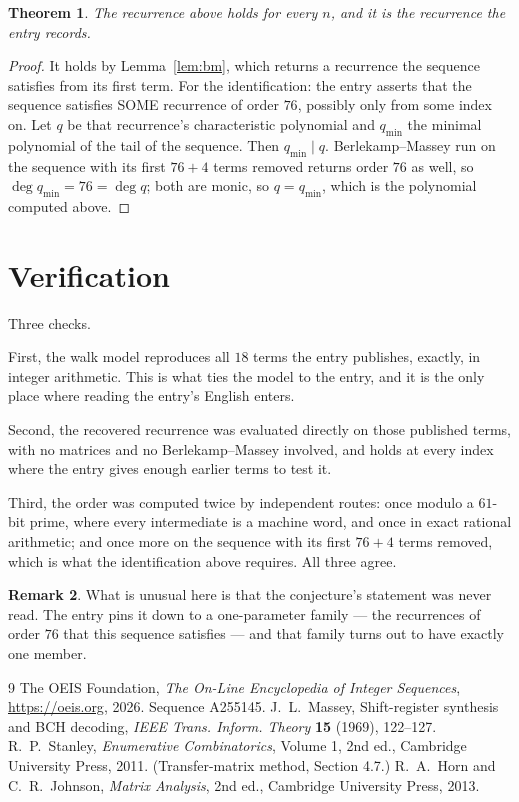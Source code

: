 \documentclass[11pt,a4paper]{article}
\theoremstyle{plain}
\newtheorem{theorem}{Theorem}
\theoremstyle{definition}
\newtheorem{remark}[theorem]{Remark}
\begin{document}
\begin{theorem}
The recurrence above holds for every $n$, and it is the recurrence the entry records.
\end{theorem}

\begin{proof}
It holds by Lemma~\ref{lem:bm}, which returns a recurrence the sequence satisfies from its
first term. For the identification: the entry asserts that the sequence satisfies SOME
recurrence of order $76$, possibly only from some index on. Let $q$ be that recurrence's
characteristic polynomial and $q_{\min}$ the minimal polynomial of the tail of the sequence.
Then $q_{\min}\mid q$. Berlekamp--Massey run on the sequence with its first $76+4$ terms
removed returns order $76$ as well, so $\deg q_{\min}=76=\deg q$; both are monic, so
$q=q_{\min}$, which is the polynomial computed above.
\end{proof}

\section{Verification}

Three checks.

First, the walk model reproduces all $18$ terms the entry publishes, exactly, in integer
arithmetic. This is what ties the model to the entry, and it is the only place where reading
the entry's English enters.

Second, the recovered recurrence was evaluated directly on those published terms, with no
matrices and no Berlekamp--Massey involved, and holds at every index where the entry gives
enough earlier terms to test it.

Third, the order was computed twice by independent routes: once modulo a $61$-bit prime, where
every intermediate is a machine word, and once in exact rational arithmetic; and once more on
the sequence with its first $76+4$ terms removed, which is what the identification above
requires. All three agree.

\begin{remark}
What is unusual here is that the conjecture's statement was never read. The entry pins it down
to a one-parameter family --- the recurrences of order $76$ that this sequence satisfies
--- and that family turns out to have exactly one member.
\end{remark}

\begin{thebibliography}{9}
 The OEIS Foundation, \emph{The On-Line Encyclopedia of Integer
Sequences}, \url{https://oeis.org}, 2026. Sequence A255145.
 J.~L.~Massey, Shift-register synthesis and BCH decoding, \emph{IEEE
Trans. Inform. Theory} \textbf{15} (1969), 122--127.
 R.~P.~Stanley, \emph{Enumerative Combinatorics}, Volume 1, 2nd ed.,
Cambridge University Press, 2011. (Transfer-matrix method, Section 4.7.)
 R.~A.~Horn and C.~R.~Johnson, \emph{Matrix Analysis}, 2nd ed., Cambridge
University Press, 2013.
\end{thebibliography}
\end{document}
